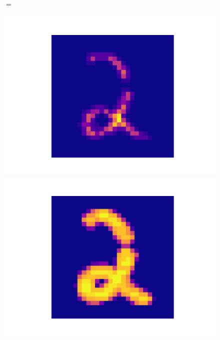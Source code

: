 \begin{figure}[h]
\begin{center}
\begin{minipage}{0.49\linewidth}
\begin{minipage}{0.06\linewidth}
        \large $=$
    \end{minipage}%
    \begin{minipage}{0.3\linewidth}
        \centering
        \includegraphics[width=1.0\textwidth]{figures/eroded.pdf}
    \end{minipage}
\end{minipage}%
\hfill%
\begin{minipage}{0.49\linewidth}
    \begin{minipage}{0.3\linewidth}
        \centering
        \includegraphics[width=1.0\textwidth]{figures/original.pdf}
    \end{minipage}%
    \begin{minipage}{0.04\linewidth}

\end{minipage}
\end{minipage}
\end{center}
\end{figure}
